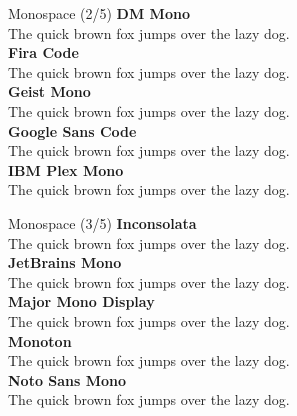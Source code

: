 \documentclass[10pt]{beamer}
\begin{document}
\begin{frame}{Monospace (2/5)}
\vspace{-0.2cm}
  {\DMMonoLocal\Large\bfseries DM Mono\\}
  {\DMMonoLocal The quick brown fox jumps over the lazy dog.\\[0.3cm]}
  {\FiraCodeLocal\Large\bfseries Fira Code\\}
  {\FiraCodeLocal The quick brown fox jumps over the lazy dog.\\[0.3cm]}
  {\GeistMonoLocal\Large\bfseries Geist Mono\\}
  {\GeistMonoLocal The quick brown fox jumps over the lazy dog.\\[0.3cm]}
  {\GoogleSansCodeLocal\Large\bfseries Google Sans Code\\}
  {\GoogleSansCodeLocal The quick brown fox jumps over the lazy dog.\\[0.3cm]}
  {\IBMPlexMonoLocal\Large\bfseries IBM Plex Mono\\}
  {\IBMPlexMonoLocal The quick brown fox jumps over the lazy dog.\\[0.3cm]}
\end{frame}

\begin{frame}{Monospace (3/5)}
\vspace{-0.2cm}
  {\InconsolataLocal\Large\bfseries Inconsolata\\}
  {\InconsolataLocal The quick brown fox jumps over the lazy dog.\\[0.3cm]}
  {\JetBrainsMonoLocal\Large\bfseries JetBrains Mono\\}
  {\JetBrainsMonoLocal The quick brown fox jumps over the lazy dog.\\[0.3cm]}
  {\MajorMonoDisplayLocal\Large\bfseries Major Mono Display\\}
  {\MajorMonoDisplayLocal The quick brown fox jumps over the lazy dog.\\[0.3cm]}
  {\MonotonLocal\Large\bfseries Monoton\\}
  {\MonotonLocal The quick brown fox jumps over the lazy dog.\\[0.3cm]}
  {\NotoSansMonoLocal\Large\bfseries Noto Sans Mono\\}
  {\NotoSansMonoLocal The quick brown fox jumps over the lazy dog.\\[0.3cm]}
\end{frame}
\end{document}
